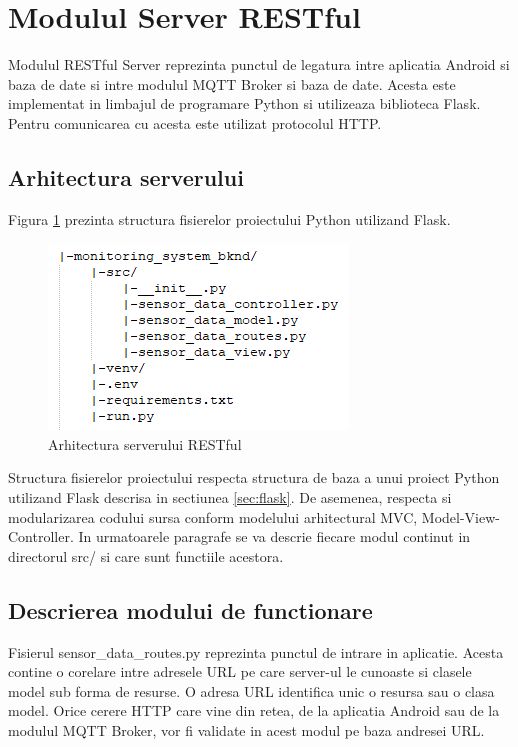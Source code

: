\section{Modulul Server RESTful}\label{sec:pi_restserver}
Modulul RESTful Server reprezinta punctul de legatura intre aplicatia Android si baza de date si intre modulul MQTT Broker si baza de date. Acesta este implementat in limbajul 
de programare Python si utilizeaza biblioteca Flask. Pentru comunicarea cu acesta este utilizat protocolul HTTP. 

\subsection{Arhitectura serverului}\label{subsec:pi_restserver_arhitectura}
Figura \ref{fig:PI_RealFlaskProjectStructure} prezinta structura fisierelor proiectului Python utilizand Flask. 
\begin{figure}[H]
    \centering
    \includegraphics[scale=0.9]{figs/PI_RealFlaskProjectStructure.png}
    \caption{Arhitectura serverului RESTful}
    \label{fig:PI_RealFlaskProjectStructure}
\end{figure}

Structura fisierelor proiectului respecta structura de baza a unui proiect Python utilizand Flask descrisa in sectiunea \ref{sec:flask}. De asemenea, respecta si 
modularizarea codului sursa conform modelului arhitectural MVC, Model-View-Controller. In urmatoarele paragrafe se va descrie fiecare modul continut in directorul 
src/ si care sunt functiile acestora.

\subsection{Descrierea modului de functionare}\label{subsec:pi_restserver_functionare}
Fisierul sensor\_data\_routes.py reprezinta punctul de intrare in aplicatie. Acesta contine o corelare intre adresele URL pe care server-ul le cunoaste si clasele model 
sub forma de resurse. O adresa URL identifica unic o resursa sau o clasa model. Orice cerere HTTP care vine din retea, de la aplicatia Android sau de la modulul MQTT Broker, 
vor fi validate in acest modul pe baza andresei URL.

